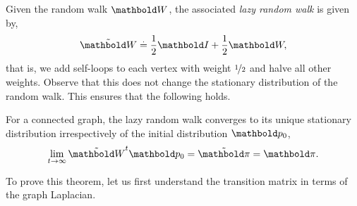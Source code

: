 Given the random walk $\mW$, the associated \emph{lazy random walk} is given by, \begin{align*}
    \Tilde{\mW} \defeq \frac{1}{2}\mI + \frac{1}{2}\mW,
\end{align*} that is, we add self-loops to each vertex with weight $\nicefrac{1}{2}$ and halve all other weights. Observe that this does not change the stationary distribution of the random walk. This ensures that the following holds.

\begin{thm}\label{thm:convergence_of_lazy_random_walk}
For a connected graph, the lazy random walk converges to its unique stationary distribution irrespectively of the initial distribution $\vp_0$, \begin{align}
    \lim_{t\to\infty} \Tilde{\mW}^t\vp_0 = \Tilde{\vpi} = \vpi.
\end{align}
\end{thm}

To prove this theorem, let us first understand the transition matrix in terms of the graph Laplacian.

